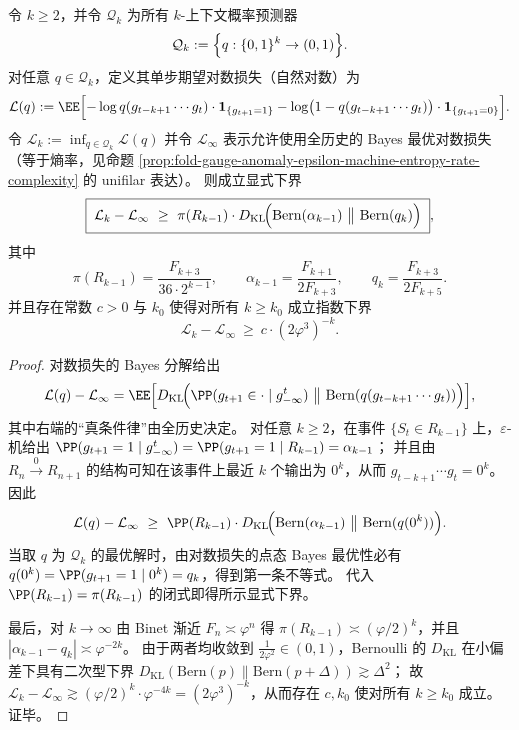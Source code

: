 \begin{theorem}\label{thm:fold-gauge-anomaly-logloss-context-gap}
令 \(k\ge 2\)，并令 \(\mathcal Q_k\) 为所有 \(k\)-上下文概率预测器
\[
\mathcal Q_k:=\Bigl\{q:\{0,1\}^k\to(0,1)\Bigr\}.
\]
对任意 \(q\in\mathcal Q_k\)，定义其单步期望对数损失（自然对数）为
\[
\mathcal L(q):=
\EE\Bigl[-\log q(g_{t-k+1}\cdots g_t)\cdot \mathbf 1_{\{g_{t+1}=1\}}
-\log\bigl(1-q(g_{t-k+1}\cdots g_t)\bigr)\cdot \mathbf 1_{\{g_{t+1}=0\}}\Bigr].
\]
令
\(
\mathcal L_k:=\inf_{q\in\mathcal Q_k}\mathcal L(q)
\)
并令 \(\mathcal L_\infty\) 表示允许使用全历史的 Bayes 最优对数损失（等于熵率，见命题 \ref{prop:fold-gauge-anomaly-epsilon-machine-entropy-rate-complexity} 的 unifilar 表达）。
则成立显式下界
\[
\boxed{\;
\mathcal L_k-\mathcal L_\infty
\ \ge\
\pi(R_{k-1})\cdot
D_{\mathrm{KL}}\!\Bigl(\mathrm{Bern}(\alpha_{k-1})\ \big\|\ \mathrm{Bern}(q_k)\Bigr)\;},
\]
其中
\[
\pi(R_{k-1})=\frac{F_{k+3}}{36\cdot 2^{k-1}},
\qquad
\alpha_{k-1}=\frac{F_{k+1}}{2F_{k+3}},
\qquad
q_k=\frac{F_{k+3}}{2F_{k+5}}.
\]
并且存在常数 \(c>0\) 与 \(k_0\) 使得对所有 \(k\ge k_0\) 成立指数下界
\[
\mathcal L_k-\mathcal L_\infty\ \ge\ c\cdot (2\varphi^3)^{-k}.
\]
\end{theorem}
\begin{proof}
对数损失的 Bayes 分解给出
\[
\mathcal L(q)-\mathcal L_\infty
=
\EE\Bigl[
D_{\mathrm{KL}}\!\Bigl(\PP(g_{t+1}\in\cdot\mid g_{-\infty}^t)\ \big\|\ \mathrm{Bern}(q(g_{t-k+1}\cdots g_t))\Bigr)
\Bigr],
\]
其中右端的“真条件律”由全历史决定。
对任意 \(k\ge 2\)，在事件 \(\{S_t\in R_{k-1}\}\) 上，\(\varepsilon\)-机给出
\(
\PP(g_{t+1}=1\mid g_{-\infty}^t)=\PP(g_{t+1}=1\mid R_{k-1})=\alpha_{k-1}
\)；
并且由 \(R_n\xrightarrow{0}R_{n+1}\) 的结构可知在该事件上最近 \(k\) 个输出为 \(0^k\)，从而 \(g_{t-k+1}\cdots g_t=0^k\)。
因此
\[
\mathcal L(q)-\mathcal L_\infty
\ \ge\
\PP(R_{k-1})\cdot
D_{\mathrm{KL}}\!\Bigl(\mathrm{Bern}(\alpha_{k-1})\ \big\|\ \mathrm{Bern}(q(0^k))\Bigr).
\]
当取 \(q\) 为 \(\mathcal Q_k\) 的最优解时，由对数损失的点态 Bayes 最优性必有 \(q(0^k)=\PP(g_{t+1}=1\mid 0^k)=q_k\)，得到第一条不等式。
代入 \(\PP(R_{k-1})=\pi(R_{k-1})\) 的闭式即得所示显式下界。
\par
最后，对 \(k\to\infty\) 由 Binet 渐近 \(F_n\asymp \varphi^n\) 得 \(\pi(R_{k-1})\asymp (\varphi/2)^k\)，并且 \(|\alpha_{k-1}-q_k|\asymp \varphi^{-2k}\)。
由于两者均收敛到 \(\frac{1}{2\varphi^2}\in(0,1)\)，Bernoulli 的 \(D_{\mathrm{KL}}\) 在小偏差下具有二次型下界 \(D_{\mathrm{KL}}(\mathrm{Bern}(p)\|\mathrm{Bern}(p+\Delta))\gtrsim \Delta^2\)；
故 \(\mathcal L_k-\mathcal L_\infty\gtrsim (\varphi/2)^k\cdot\varphi^{-4k}=(2\varphi^3)^{-k}\)，从而存在 \(c,k_0\) 使对所有 \(k\ge k_0\) 成立。证毕。
\end{proof}

